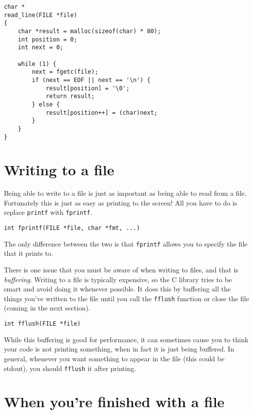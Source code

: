 \begin{lstlisting}
char *
read_line(FILE *file)
{
    char *result = malloc(sizeof(char) * 80);
    int position = 0;
    int next = 0;

    while (1) {
        next = fgetc(file);
        if (next == EOF || next == '\n') {
            result[position] = '\0';
            return result;
        } else {
            result[position++] = (char)next;
        }
    }
}
\end{lstlisting}

\section{Writing to a file}

Being able to write to a file is just as important as being able to read from a file.
Fortunately this is just as easy as printing to the screen!
All you have to do is replace \texttt{printf} with \texttt{fprintf}.

\begin{lstlisting}[numbers=none,frame=none]
int fprintf(FILE *file, char *fmt, ...)
\end{lstlisting}

The only difference between the two is that \texttt{fprintf} allows you to specify the file that it prints to.

There is one issue that you must be aware of when writing to files, and that is \emph{buffering}. 
Writing to a file is typically expensive, so the C library tries to be smart and avoid doing it whenever possible.
It does this by buffering all the things you've written to the file until you call the \texttt{fflush} function or close the file (coming in the next section).

\begin{lstlisting}[numbers=none,frame=none]
int fflush(FILE *file)
\end{lstlisting}

While this buffering is good for performance, it can sometimes cause you to think your code is not printing something, when in fact it is just being buffered.
In general, whenever you want something to appear in the file (this could be stdout), you should \texttt{fflush} it after printing.

\section{When you're finished with a file}


